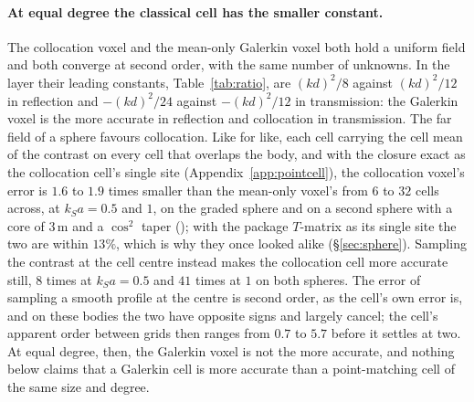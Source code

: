 \documentclass[11pt,a4paper]{article}
\begin{document}
\paragraph{At equal degree the classical cell has the smaller constant.} The collocation voxel and the
mean-only Galerkin voxel both hold a uniform field and both converge at second order, with the same number
of unknowns. In the layer their leading constants, Table~\ref{tab:ratio}, are $(kd)^2/8$ against
$(kd)^2/12$ in reflection and $-(kd)^2/24$ against $-(kd)^2/12$ in transmission: the Galerkin voxel is the
more accurate in reflection and collocation in transmission. The far field of a sphere favours collocation.
Like for like, each cell carrying the cell mean of the contrast on every cell that overlaps the body, and
with the closure exact as the collocation cell's single site (Appendix~\ref{app:pointcell}), the collocation
voxel's error is $1.6$ to $1.9$ times smaller than the mean-only voxel's from $6$ to $32$ cells across, at
$k_Sa=0.5$ and $1$, on the graded sphere and on a second sphere with a core of $3$\,m and a $\cos^2$ taper
(); with the package $T$-matrix as its single site the two are
within $13\%$, which is why they once looked alike (\S\ref{sec:sphere}). Sampling the contrast at the cell
centre instead makes the collocation cell more accurate still, $8$ times at $k_Sa=0.5$ and $41$ times at
$1$ on both spheres. The error of sampling a smooth profile at the centre is second order, as the cell's
own error is, and on these bodies the two have opposite signs and largely cancel; the cell's apparent order
between grids then ranges from $0.7$ to $5.7$ before it settles at two. At equal degree, then, the
Galerkin voxel is not the more accurate, and nothing below claims that a Galerkin cell is more accurate
than a point-matching cell of the same size and degree.
\end{document}
